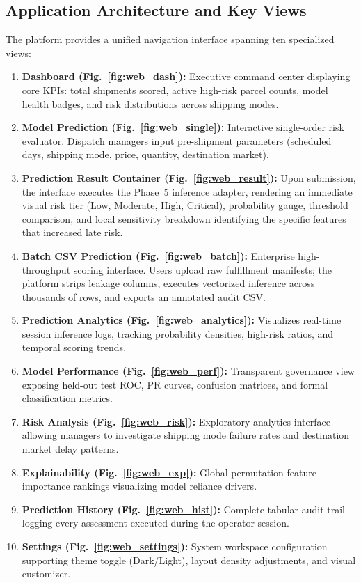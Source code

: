 \documentclass[journal,10pt,twocolumn]{IEEEtran}
\begin{document}
\subsection{Application Architecture and Key Views}
The platform provides a unified navigation interface spanning ten specialized views:
\begin{enumerate}
    \item \textbf{Dashboard (Fig.~\ref{fig:web_dash}):} Executive command center displaying core KPIs: total shipments scored, active high-risk parcel counts, model health badges, and risk distributions across shipping modes.
    \item \textbf{Model Prediction (Fig.~\ref{fig:web_single}):} Interactive single-order risk evaluator. Dispatch managers input pre-shipment parameters (scheduled days, shipping mode, price, quantity, destination market).
    \item \textbf{Prediction Result Container (Fig.~\ref{fig:web_result}):} Upon submission, the interface executes the Phase~5 inference adapter, rendering an immediate visual risk tier (Low, Moderate, High, Critical), probability gauge, threshold comparison, and local sensitivity breakdown identifying the specific features that increased late risk.
    \item \textbf{Batch CSV Prediction (Fig.~\ref{fig:web_batch}):} Enterprise high-throughput scoring interface. Users upload raw fulfillment manifests; the platform strips leakage columns, executes vectorized inference across thousands of rows, and exports an annotated audit CSV.
    \item \textbf{Prediction Analytics (Fig.~\ref{fig:web_analytics}):} Visualizes real-time session inference logs, tracking probability densities, high-risk ratios, and temporal scoring trends.
    \item \textbf{Model Performance (Fig.~\ref{fig:web_perf}):} Transparent governance view exposing held-out test ROC, PR curves, confusion matrices, and formal classification metrics.
    \item \textbf{Risk Analysis (Fig.~\ref{fig:web_risk}):} Exploratory analytics interface allowing managers to investigate shipping mode failure rates and destination market delay patterns.
    \item \textbf{Explainability (Fig.~\ref{fig:web_exp}):} Global permutation feature importance rankings visualizing model reliance drivers.
    \item \textbf{Prediction History (Fig.~\ref{fig:web_hist}):} Complete tabular audit trail logging every assessment executed during the operator session.
    \item \textbf{Settings (Fig.~\ref{fig:web_settings}):} System workspace configuration supporting theme toggle (Dark/Light), layout density adjustments, and visual customizer.
\end{enumerate}
\end{document}
